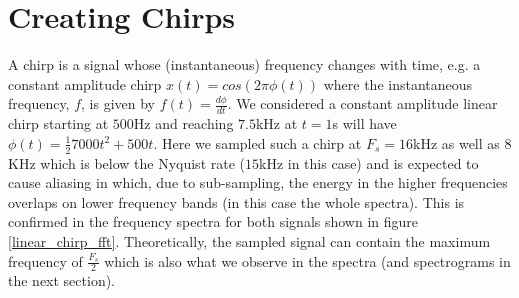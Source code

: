 \documentclass[10pt]{article}
\begin{document}
\section{Creating Chirps}
A chirp is a signal whose (instantaneous) frequency changes with time, e.g. a constant amplitude chirp $x(t) = cos(2\pi\phi(t))$ where the instantaneous frequency, $f$, is given by $f(t) = \frac{d\phi}{dt}$. We considered a constant amplitude linear chirp starting at $500$Hz and reaching $7.5$kHz at $t=1$s will have $\phi(t) = \frac{1}{2}7000t^2 + 500t$. Here we sampled such a chirp at $F_s = 16$kHz as well as $8$KHz which is below the Nyquist rate ($15$kHz in this case) and is expected to cause aliasing in which, due to sub-sampling, the energy in the higher frequencies overlaps on lower frequency bands (in this case the whole spectra). This is confirmed in the frequency spectra for both signals shown in figure \ref{linear_chirp_fft}. Theoretically, the sampled signal can contain the maximum frequency of $\frac{F_s}{2}$ which is also what we observe in the spectra (and spectrograms in the next section).
\end{document}
